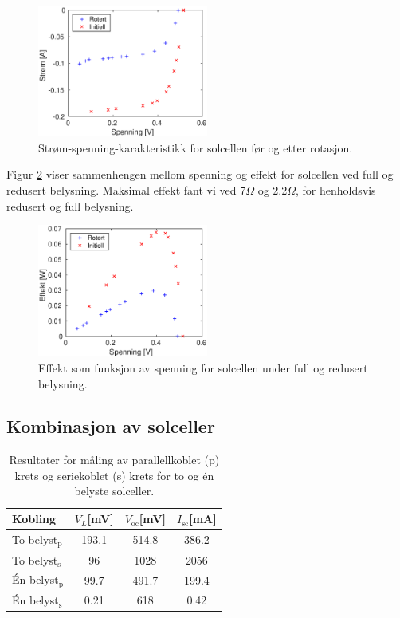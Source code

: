 \documentclass[a4paper,11pt, twocolumn]{article}
\begin{document}
\begin{figure}[!ht]
	\includegraphics[width = 0.5\textwidth]{matlab/LAB/currentVoltageRotated.eps}
	\caption{Strøm-spenning-karakteristikk for solcellen før og etter rotasjon.}
	\label{fig:currentVoltageRotation}
\end{figure}

Figur \ref{fig:effekt} viser sammenhengen mellom spenning og effekt for solcellen ved full og redusert belysning. Maksimal effekt fant vi ved 7$\Omega$ og 2.2$\Omega$, for henholdsvis redusert og full belysning.
\begin{figure}[!ht]
	\includegraphics[width = 0.5\textwidth]{matlab/LAB/optimalBelastning.eps}
	\caption{Effekt som funksjon av spenning for solcellen under full og redusert belysning.}
	\label{fig:effekt}
\end{figure}

\subsection{Kombinasjon av solceller}

\begin{table}[!ht]
	\begin{tabular}{lccc}
		\toprule
		\toprule
		Kobling & $V_L$[mV] & $V_\text{oc}$[mV] & $I_\text{sc}$[mA]\\
		\hline
		To belyst$_\text{p}$ & 193.1 & 514.8 & 386.2\\
		To belyst$_\text{s}$ &  96 & 1028 & 2056\\
		\'En belyst$_\text{p}$ &  99.7 & 491.7 & 199.4\\
		\'En belyst$_\text{s}$ &  0.21 & 618 & 0.42\\
		\toprule
	\end{tabular}
	\caption{Resultater for måling av parallellkoblet (p) krets og seriekoblet (s) krets for to og \'en belyste solceller.}
\end{table}
\end{document}

